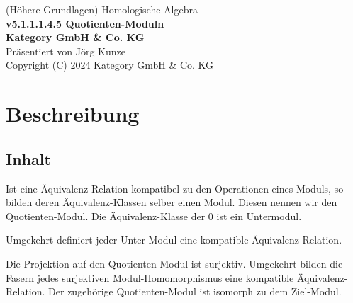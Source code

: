 \documentclass[a4paper]{amsart}
\theoremstyle{definition}
\begin{document}
\begin{titlepage}
\centering
{\huge
(Höhere Grundlagen) Homologische Algebra\\[1cm]
\textbf{v5.1.1.1.4.5 Quotienten-Moduln}
}\\[1cm]

\textbf{Kategory GmbH \& Co. KG}\\
Präsentiert von Jörg Kunze\\
Copyright (C) 2024 Kategory GmbH \& Co. KG

\end{titlepage}

%

\newpage

\section*{Beschreibung}

\subsection*{Inhalt}
Ist eine Äquivalenz-Relation kompatibel zu den Operationen eines Moduls, so bilden deren Äquivalenz-Klassen selber einen Modul. Diesen nennen wir den Quotienten-Modul. Die Äquivalenz-Klasse der $0$ ist ein Untermodul.

Umgekehrt definiert jeder Unter-Modul eine kompatible Äquivalenz-Relation.

Die Projektion auf den Quotienten-Modul ist surjektiv. Umgekehrt bilden die Fasern jedes surjektiven Modul-Homomorphismus eine kompatible Äquivalenz-Relation. Der zugehörige Quotienten-Modul ist isomorph zu dem Ziel-Modul.
\end{document}

